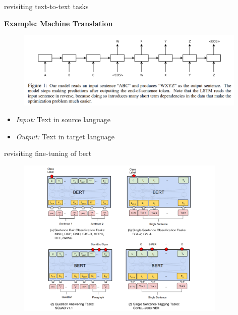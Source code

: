 
\begin{frame}{revisiting text-to-text tasks}

\vfill

\textbf{Example: Machine Translation}
	
	\begin{figure}
		\centering
		\includegraphics[width = 11cm]{../chapter01-basics/figure/seq2seq.png}\\ 
	\end{figure}

\begin{itemize}
	\item \textit{Input:} Text in source language
	\item \textit{Output:} Text in target language
\end{itemize}

\vfill

\end{frame}


\begin{frame}{revisiting fine-tuning of bert}
	\begin{figure}
	\centering
		\includegraphics[width = 10cm]{../chapter04-bert/figure/bert-finetune.png}\\ 
	\end{figure}
\end{frame}

